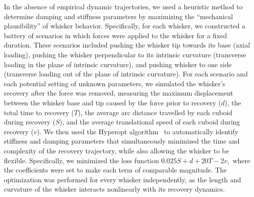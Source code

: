 In the absence of empirical dynamic trajectories, we used a heuristic method to determine damping and stiffness parameters by maximizing the ``mechanical plausibility'' of whisker behavior. 
Specifically, for each whisker, we constructed a battery of scenarios in which forces were applied to the whisker for a fixed duration.  These scenarios included pushing the whisker tip towards its base (axial loading), pushing the whisker perpendicular to its intrinsic curvature (transverse loading in the plane of intrinsic curvature), and pushing whisker to one side (transverse loading out of the plane of intrinsic curvature).  
For each scenario and each potential setting of unknown parameters, we simulated the whisker's recovery after the force was removed, measuring the maximum displacement between the whisker base and tip caused by the force prior to recovery ($d$), the total time to recovery ($T$), the average arc distance travelled by each cuboid during recovery ($S$), and the average translational speed of each cuboid during recovery ($v$).    
We then used the Hyperopt algorithm~\cite{bergstra2013hyperopt} to automatically identify stiffness and damping parameters that simultaneously minimized the time and complexity of the recovery trajectory, while also allowing the whisker to be flexible.   
Specifically, we minimized the loss function $0.025S + d + 20T - 2v,$ where the coefficients were set to make each term of comparable magnitude.   
The optimization was performed for every whisker independently, as the length and curvature of the whisker interacts nonlinearly with its recovery dynamics.   



